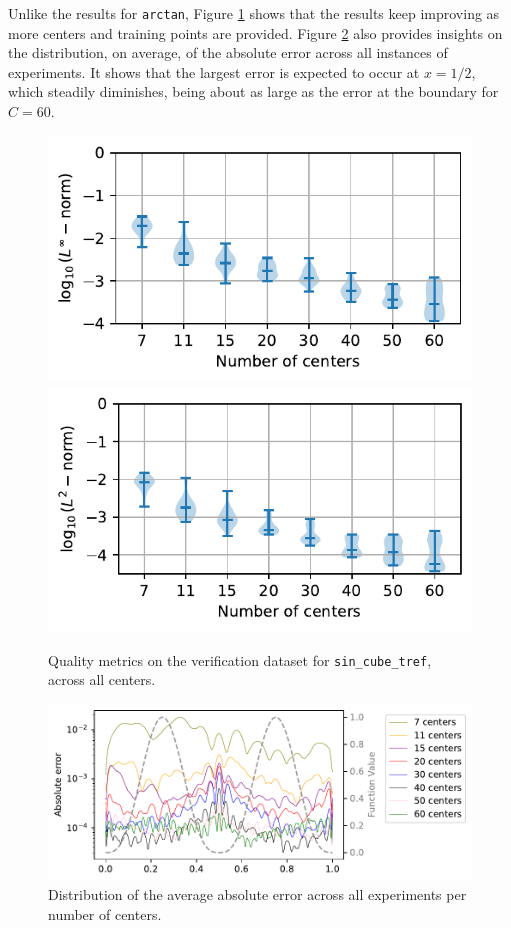 \documentclass[12pt]{report} %
\begin{document}
Unlike the results for \texttt{arctan}, Figure \ref{fig:violins-sin-cube-tref} shows that the results keep improving as more centers and training points are provided. Figure \ref{fig:distribution-avg-absolute-error-sin-cube-tref} also provides insights on the distribution, on average, of the absolute error across all instances of experiments. It shows that the largest error is expected to occur at $x=1/2$, which steadily diminishes, being about as large as the error at the boundary for $C=60$.

\begin{figure}
  \includegraphics[width=.45\textwidth]{imagenes/experiments/1d/statistical_1d_full_scheduler_interpolation/sin_cube_tref/violins_linf_sin_cube_tref_endgame_2.pdf}
  \includegraphics[width=.45\textwidth]{imagenes/experiments/1d/statistical_1d_full_scheduler_interpolation/sin_cube_tref/violins_l2_sin_cube_tref_endgame.pdf}
  \caption{Quality metrics on the verification dataset for \texttt{sin\_cube\_tref}, across all centers.}
  \label{fig:violins-sin-cube-tref}
\end{figure}

\begin{figure}
  \includegraphics[width=\textwidth]{imagenes/experiments/1d/statistical_1d_full_scheduler_interpolation/sin_cube_tref/sin_cube_tref_avg_error.pdf}
  \caption{Distribution of the average absolute error across all experiments per number of centers.}
  \label{fig:distribution-avg-absolute-error-sin-cube-tref}
\end{figure}
\end{document}
